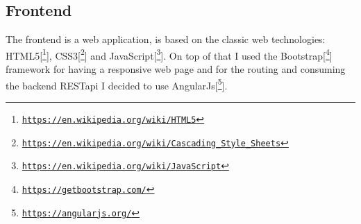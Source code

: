 

\subsection{Frontend}
The frontend is a web application, is based on the classic web technologies: HTML5[\footnote{\href{https://en.wikipedia.org/wiki/HTML5}{\texttt{https://en.wikipedia.org/wiki/HTML5}}}], CSS3[\footnote{\href{https://en.wikipedia.org/wiki/Cascading\_Style\_Sheets}{\texttt{https://en.wikipedia.org/wiki/Cascading\_Style\_Sheets}}}] and JavaScript[\footnote{\href{https://en.wikipedia.org/wiki/JavaScript}{\texttt{https://en.wikipedia.org/wiki/JavaScript}}}]. On top of that I used the Bootstrap[\footnote{\href{https://getbootstrap.com/}{\texttt{https://getbootstrap.com/}}}] framework for having a responsive web page and for the routing and consuming the backend RESTapi I decided to use AngularJs[\footnote{\href{https://angularjs.org/}{\texttt{https://angularjs.org/}}}].

